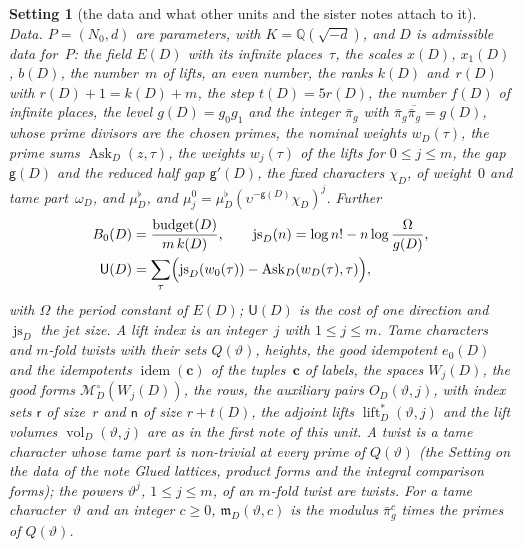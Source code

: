\documentclass[11pt,a4paper]{article}
\newcommand{\kw}[1]{\emph{#1}}
\newcommand{\m}[1]{\mbox{$#1$}}        %
\theoremstyle{plainx}
\theoremstyle{uprightx}
\newtheorem{setting}[theorem]{Setting}          %
\newcommand{\ix}[1]{\mathsf{#1}}
\newcommand{\Mgood}[1]{\mathcal{M}^{\circ}_D(W_{#1}(D))}
\newcommand{\alift}{\operatorname{lift}^{*}}
\newcommand{\lvol}[2]{\operatorname{vol}_D(#1,#2)}
\newcommand{\idem}{\operatorname{idem}}
\begin{document}
\begin{setting}[the data and what other units and the sister notes attach to it]
\emph{Data.} $P=(N_0,d)$ are parameters, with \m{K=\mathbb{Q}(\sqrt{-d})}, and $D$ is admissible data for~$P$: the
field \m{E(D)} with its infinite places~$\tau$, the scales $x(D)$, $x_1(D)$, $b(D)$, the number~$m$ of lifts, an even
number, the ranks \m{k(D)} and~$r(D)$ with \m{r(D)+1=k(D)+m}, the step \m{t(D)=5r(D)}, the number \m{f(D)} of infinite places,
the level \m{g(D)=g_0g_1} and the integer \m{\bar\pi_g} with \m{\bar\pi_g\overline{\bar\pi_g}=g(D)}, whose prime
divisors are the chosen primes, the nominal weights \m{w_D(\tau)}, the prime sums \m{\operatorname{Ask}_D(z,\tau)}, the
weights \m{w_j(\tau)} of the lifts for \m{0\le j\le m}, the gap \m{\mathsf{g}(D)} and the reduced half gap
\m{\mathsf{g}'(D)}, the fixed characters \m{\chi_D}, of weight~$0$ and tame part~$\omega_D$, and \m{\mu^{\flat}_D}, and
\m{\mu^{0}_j=\mu^{\flat}_D(\upsilon^{-\mathsf{g}(D)}\chi_D)^{j}}. Further
\begin{align*}
B_0(D)&=\frac{\operatorname{budget}(D)}{m\,k(D)},\qquad\operatorname{js}_D(n)=\log n!-n\log\frac{\Omega}{g(D)},\\
\mathsf{U}(D)&=\sum_\tau\Bigl(\operatorname{js}_D(w_0(\tau))-\operatorname{Ask}_D(w_D(\tau),\tau)\Bigr),
\end{align*}
with $\Omega$ the period constant of \m{E(D)}; \m{\mathsf{U}(D)} is the \kw{cost of one direction} and
\m{\operatorname{js}_D} the \kw{jet size}. A lift index is an integer~$j$ with \m{1\le j\le m}. Tame characters and
$m$-fold twists with their sets \m{Q(\vartheta)}, heights, the good idempotent \m{e_0(D)} and the idempotents
\m{\idem(\mathbf{c})} of the tuples~$\mathbf{c}$ of labels, the spaces $W_j(D)$, the good forms \m{\Mgood{j}}, the rows,
the auxiliary pairs \m{O_D(\vartheta,j)}, with index sets \m{\ix r} of size~$r$ and \m{\ix n} of size \m{r+t(D)}, the
adjoint lifts \m{\alift_D(\vartheta,j)} and the lift volumes \m{\lvol{\vartheta}{j}} are as in the first note of this
unit. A \kw{twist} is a tame character whose tame part is non-trivial at every prime of \m{Q(\vartheta)} (the Setting
on the data of the note \emph{Glued lattices, product forms and the integral comparison forms}); the powers
\m{\vartheta^{j}}, \m{1\le j\le m}, of an $m$-fold twist are twists. For a tame character~$\vartheta$ and an integer
\m{c\ge0}, \m{\mathfrak{m}_D(\vartheta,c)} is the modulus \m{\bar\pi_g^{c}} times the primes of \m{Q(\vartheta)}.


\end{setting}
\end{document}
